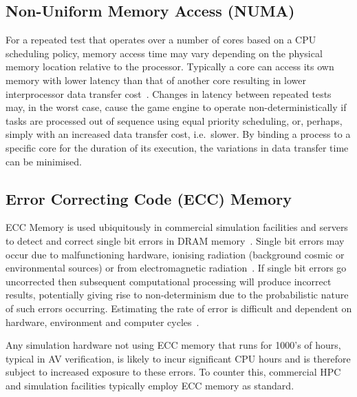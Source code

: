 \documentclass[letterpaper, 10 pt, journal, twoside]{IEEEtran}
\begin{document}
\subsection{Non-Uniform Memory Access (NUMA)} \label{s:sources_numa}
For a repeated test that operates over a number of cores based on a CPU scheduling policy, memory access time may vary depending on the physical memory location relative to the processor. Typically a core can access its own memory with lower latency than that of another core resulting in lower interprocessor data transfer cost~\cite{nieplocha1996global}. 
%
Changes in latency between repeated tests may, in the worst case, cause the game engine to operate non-deterministically if tasks are processed out of sequence using equal priority scheduling, or, perhaps, simply with an increased data transfer cost, i.e.\ slower. 
%
By binding a process to a specific core for the duration of its execution, the variations in data transfer time can be minimised.


\subsection{Error Correcting Code (ECC) Memory}
ECC Memory is used ubiquitously in commercial simulation facilities and servers to detect and correct single bit errors in DRAM memory~\cite{Dell1997}. Single bit errors may occur due to malfunctioning hardware, ionising radiation (background cosmic or environmental sources) or from electromagnetic radiation~\cite{dodd2003basic}. If single bit errors go uncorrected then subsequent computational processing will produce incorrect results, potentially giving rise to non-determinism due to the probabilistic nature of such errors occurring. Estimating the rate of error is difficult and dependent on hardware, environment and computer cycles~\cite{mielke2008bit}.

Any simulation hardware not using ECC memory that runs for 1000's of hours, typical in AV verification, is likely to incur significant CPU hours and is therefore subject to increased exposure to these errors. To counter this, commercial HPC and simulation facilities typically employ ECC memory as standard.

\end{document}
